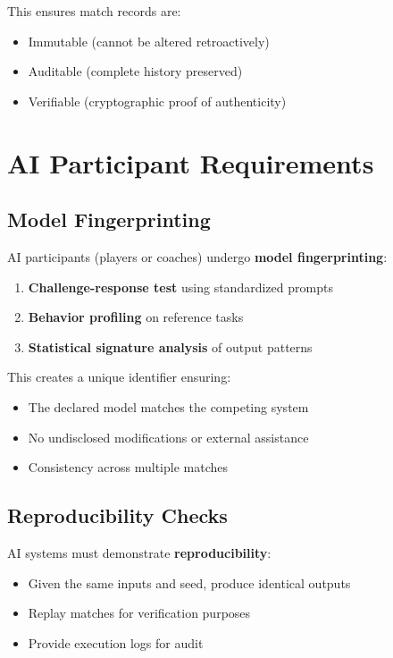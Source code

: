 This ensures match records are:
\begin{itemize}[leftmargin=*]
  \item Immutable (cannot be altered retroactively)
  \item Auditable (complete history preserved)
  \item Verifiable (cryptographic proof of authenticity)
\end{itemize}

\section{AI Participant Requirements}

\subsection{Model Fingerprinting}

AI participants (players or coaches) undergo \textbf{model fingerprinting}:
\begin{enumerate}
  \item \textbf{Challenge-response test} using standardized prompts
  \item \textbf{Behavior profiling} on reference tasks
  \item \textbf{Statistical signature analysis} of output patterns
\end{enumerate}

This creates a unique identifier ensuring:
\begin{itemize}[leftmargin=*]
  \item The declared model matches the competing system
  \item No undisclosed modifications or external assistance
  \item Consistency across multiple matches
\end{itemize}

\subsection{Reproducibility Checks}

AI systems must demonstrate \textbf{reproducibility}:
\begin{itemize}[leftmargin=*]
  \item Given the same inputs and seed, produce identical outputs
  \item Replay matches for verification purposes
  \item Provide execution logs for audit
\end{itemize}

